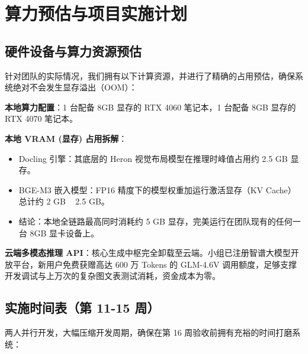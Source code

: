 ﻿\documentclass[UTF8, heading=true]{ctexart}
\begin{document}
\section{算力预估与项目实施计划}

\subsection{硬件设备与算力资源预估}

针对团队的实际情况，我们拥有以下计算资源，并进行了精确的占用预估，确保系统绝对不会发生显存溢出（OOM）：

\textbf{本地算力配置}：1 台配备 8GB 显存的 RTX 4060 笔记本，1 台配备 8GB 显存的 RTX 4070 笔记本。

\textbf{本地 VRAM (显存) 占用拆解}：

\begin{itemize}
    \item Docling 引擎：其底层的 Heron 视觉布局模型在推理时峰值占用约 2.5 GB 显存。
    \item BGE-M3 嵌入模型：FP16 精度下的模型权重加运行激活显存（KV Cache）总计约 2 GB ~ 2.5 GB。
    \item 结论：本地全链路最高同时消耗约 5 GB 显存，完美运行在团队现有的任何一台 8GB 显卡设备上。
\end{itemize}

\textbf{云端多模态推理 API}：核心生成中枢完全卸载至云端。小组已注册智谱大模型开放平台，新用户免费获赠高达 600 万 Tokens 的 GLM-4.6V 调用额度，足够支撑开发调试与上万次的复杂图文表测试消耗，资金成本为零。

\subsection{实施时间表（第 11-15 周）}

两人并行开发，大幅压缩开发周期，确保在第 16 周验收前拥有充裕的时间打磨系统：
\end{document}
